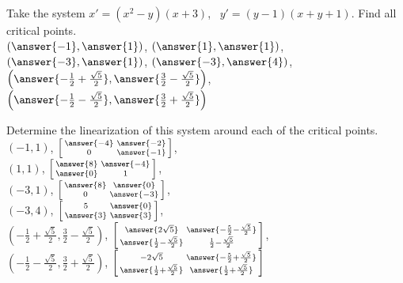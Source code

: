 \documentclass{ximera}
\begin{document}
\begin{exercise}
    Take the system $x' = (x^2 - y)(x+3)$, \ $y' = (y-1)(x+y+1)$.
    Find all critical points.\\
    $\left(\answer{-1}, \answer{1}\right)$, $\left(\answer{1}, \answer{1}\right)$, $\left(\answer{-3}, \answer{1}\right)$, $\left(\answer{-3}, \answer{4}\right)$, $\left( \answer{-\frac{1}{2} + \frac{\sqrt{5}}{2}}, \answer{\frac{3}{2} - \frac{\sqrt{5}}{2}}\right)$, $\left( \answer{-\frac{1}{2} - \frac{\sqrt{5}}{2}}, \answer{\frac{3}{2} + \frac{\sqrt{5}}{2}}\right)$
    \begin{problem}
        Determine the linearization of this system around each of the critical points.\\
            $(-1,1)$, $\left[\begin{smallmatrix} \answer{-4} & \answer{-2} \\ 0 & \answer{-1} \end{smallmatrix}\right]$, \\
            $(1,1)$, $\left[\begin{smallmatrix} \answer{8} & \answer{-4} \\ \answer{0} & 1 \end{smallmatrix}\right]$, \\
            $(-3, 1)$, $\left[\begin{smallmatrix} \answer{8} & \answer{0} \\ 0 & \answer{-3} \end{smallmatrix}\right]$,  \\
            $(-3, 4)$, $\left[\begin{smallmatrix} 5 & \answer{0} \\ \answer{3} & \answer{3} \end{smallmatrix}\right]$, \\ 
            $\left( -\frac{1}{2} + \frac{\sqrt{5}}{2}, \frac{3}{2} - \frac{\sqrt{5}}{2}\right)$, $\left[\begin{smallmatrix} \answer{2\sqrt{5}} & \answer{-\frac{5}{2} - \frac{\sqrt{5}}{2}} \\ \answer{\frac{1}{2} - \frac{\sqrt{5}}{2}} & \frac{1}{2} - \frac{\sqrt{5}}{2} \end{smallmatrix}\right]$, \\
            $\left( -\frac{1}{2} - \frac{\sqrt{5}}{2}, \frac{3}{2} + \frac{\sqrt{5}}{2}\right)$, $\left[\begin{smallmatrix} -2\sqrt{5} & \answer{-\frac{5}{2} + \frac{\sqrt{5}}{2}} \\ \answer{\frac{1}{2} + \frac{\sqrt{5}}{2}} & \answer{\frac{1}{2} + \frac{\sqrt{5}}{2}} \end{smallmatrix}\right]$\\

\end{problem}
\end{exercise}
\end{document}
